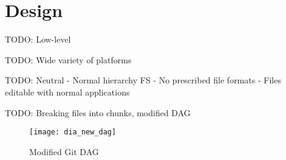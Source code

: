 \chapter{Design}

TODO: Low-level

TODO: Wide variety of platforms

TODO: Neutral
    - Normal hierarchy FS
    - No prescribed file formats
    - Files editable with normal applications

TODO: Breaking files into chunks, modified DAG

\begin{figure}[h!]
    \caption{Modified Git DAG}
    \label{fig:dia_new_dag}
    \centering
        \texttt{[image: dia\_new\_dag]}
\end{figure}

